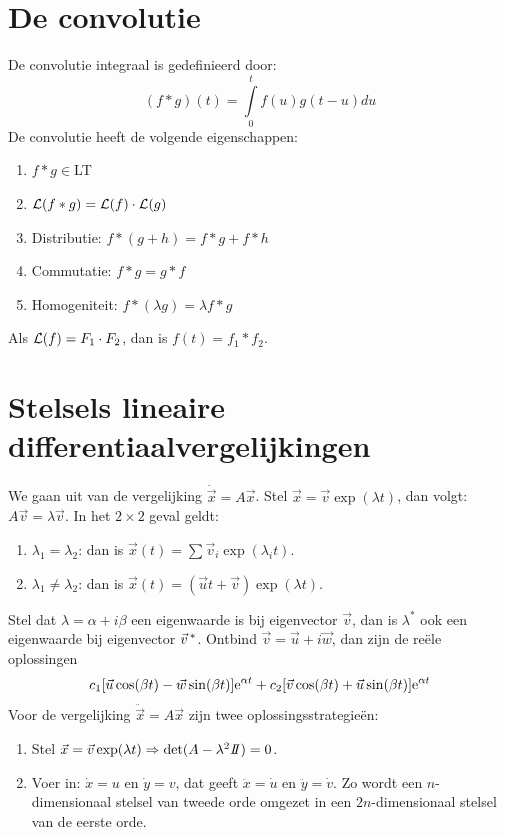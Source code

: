\documentclass[twoside]{report}
\begin{document}
\section{De convolutie}
De convolutie integraal is gedefinieerd door:
\[
(f*g)(t)=\int\limits_0^tf(u)g(t-u)du
\]
De convolutie heeft de volgende eigenschappen:
\begin{enumerate}
\item $f*g\in$LT
\item ${\cal L}(f*g)={\cal L}(f)\cdot{\cal L}(g)$
\item Distributie: $f*(g+h)=f*g+f*h$
\item Commutatie: $f*g=g*f$
\item Homogeniteit: $f*(\lambda g)=\lambda f*g$
\end{enumerate}
Als ${\cal L}(f)=F_1\cdot F_2$, dan is $f(t)=f_1*f_2$.

\section{Stelsels lineaire differentiaalvergelijkingen}
We gaan uit van de vergelijking $\dot{\vec{x}}=A\vec{x}$. Stel $\vec{x}=\vec{v}\exp(\lambda t)$,
dan volgt: $A\vec{v}=\lambda\vec{v}$. In het $2\times2$ geval geldt:
\begin{enumerate}
\item $\lambda_1=\lambda_2$: dan is $\vec{x}(t)=\sum\vec{v}_i\exp(\lambda_it)$.
\item $\lambda_1\neq\lambda_2$: dan is $\vec{x}(t)=(\vec{u}t+\vec{v})\exp(\lambda t)$.
\end{enumerate}
Stel dat $\lambda=\alpha+i\beta$ een eigenwaarde is bij eigenvector $\vec{v}$,
dan is $\lambda^*$ ook een eigenwaarde bij eigenvector $\vec{v}\,^*$. Ontbind
$\vec{v}=\vec{u}+i\vec{w}$, dan zijn de re\"ele oplossingen
\[
c_1[\vec{u}\cos(\beta t)-\vec{w}\sin(\beta t)]{\rm e}^{\alpha t}+c_2[\vec{v}\cos(\beta t)+\vec{u}\sin(\beta t)]{\rm e}^{\alpha t}
\]
\npar
Voor de vergelijking $\ddot{\vec{x}}=A\vec{x}$ zijn twee oplossingsstrategie\"en:
\begin{enumerate}
\item Stel $\vec{x}=\vec{v}\exp(\lambda t)\Rightarrow\det(A-\lambda^2I\hspace{-1mm}I)=0$.
\item Voer in: $\dot{x}=u$ en $\dot{y}=v$, dat geeft $\ddot{x}=\dot{u}$ en
      $\ddot{y}=\dot{v}$. Zo wordt een $n$-dimensionaal stelsel van tweede orde
      omgezet in een $2n$-dimensionaal stelsel van de eerste orde.
\end{enumerate}
\end{document}
